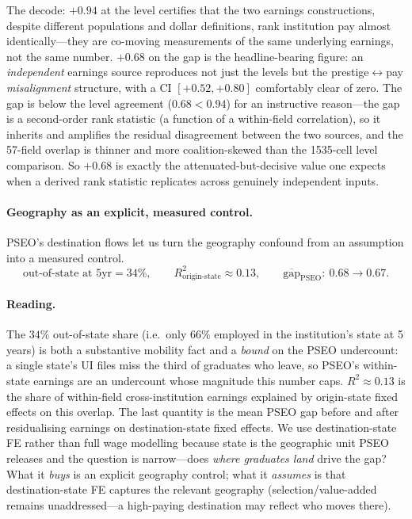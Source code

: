 \documentclass[11pt]{article}
\begin{document}
The decode: $+0.94$ at the level certifies that the two earnings constructions, despite different populations and dollar definitions, rank institution pay almost identically---they are co-moving measurements of the same underlying earnings, not the same number. $+0.68$ on the gap is the headline-bearing figure: an \emph{independent} earnings source reproduces not just the levels but the prestige$\leftrightarrow$pay \emph{misalignment} structure, with a CI $[+0.52,+0.80]$ comfortably clear of zero. The gap is below the level agreement ($0.68<0.94$) for an instructive reason---the gap is a second-order rank statistic (a function of a within-field correlation), so it inherits and amplifies the residual disagreement between the two sources, and the 57-field overlap is thinner and more coalition-skewed than the 1535-cell level comparison. So $+0.68$ is exactly the attenuated-but-decisive value one expects when a derived rank statistic replicates across genuinely independent inputs.

\paragraph{Geography as an explicit, measured control.}
PSEO's destination flows let us turn the geography confound from an assumption into a measured control.
\[
\text{out-of-state at 5yr}=34\%,\qquad R^2_{\text{origin-state}}\approx0.13,\qquad \overline{\text{gap}}_{\text{PSEO}}:\ 0.68 \to 0.67 .
\]

\paragraph{Reading.} The $34\%$ out-of-state share (i.e.\ only 66\% employed in the institution's state at 5 years) is both a substantive mobility fact and a \emph{bound} on the PSEO undercount: a single state's UI files miss the third of graduates who leave, so PSEO's within-state earnings are an undercount whose magnitude this number caps. $R^2\approx0.13$ is the share of within-field cross-institution earnings explained by origin-state fixed effects on this overlap. The last quantity is the mean PSEO gap before and after residualising earnings on destination-state fixed effects. We use destination-state FE rather than full wage modelling because state is the geographic unit PSEO releases and the question is narrow---does \emph{where graduates land} drive the gap? What it \emph{buys} is an explicit geography control; what it \emph{assumes} is that destination-state FE captures the relevant geography (selection/value-added remains unaddressed---a high-paying destination may reflect who moves there).
\end{document}
